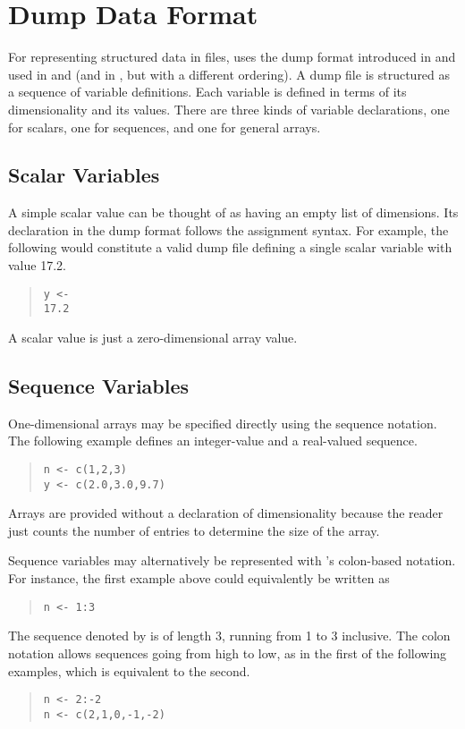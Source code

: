 \chapter{Dump Data Format}\label{dump.chapter}

\noindent 
For representing structured data in files, \Stan uses the dump format
introduced in \SPLUS and used in \R and \JAGS (and in \BUGS, but with
a different ordering).   A dump file is structured as a sequence of
variable definitions.  Each variable is defined in terms of its
dimensionality and its values.   There are three kinds of variable
declarations, one for scalars, one for sequences, and one for general
arrays.

\section{Scalar Variables}

A simple scalar value can be thought of as having an empty list of
dimensions.  Its declaration in the dump format follows the \SPLUS
assignment syntax.  For example, the following would constitute a
valid dump file defining a single scalar variable  with value
17.2.
%
\begin{quote}
\begin{Verbatim}[fontsize=\small]
y <- 
17.2
\end{Verbatim}
\end{quote}
%
A scalar value is just a zero-dimensional array value.

\section{Sequence Variables}

One-dimensional arrays may be specified directly using the \SPLUS
sequence notation.  The following example defines an integer-value and
a real-valued sequence.
%
\begin{quote}
\begin{Verbatim}[fontsize=\small]
n <- c(1,2,3)
y <- c(2.0,3.0,9.7)
\end{Verbatim}
\end{quote}
%
Arrays are provided without a declaration of dimensionality because
the reader just counts the number of entries to determine the size of
the array.

Sequence variables may alternatively be represented with \R's
colon-based notation.  For instance, the first example above could
equivalently be written as
%
\begin{quote}
\begin{Verbatim} 
n <- 1:3
\end{Verbatim}
\end{quote}
% 
The sequence denoted by  is of length 3, running from 1 to 3
inclusive.  The colon notation allows sequences going from high to
low, as in the first of the following examples, which is equivalent to
the second.
%
\begin{quote}
\begin{Verbatim}[fontsize=\small]
n <- 2:-2
n <- c(2,1,0,-1,-2)
\end{Verbatim}
\end{quote}
%


